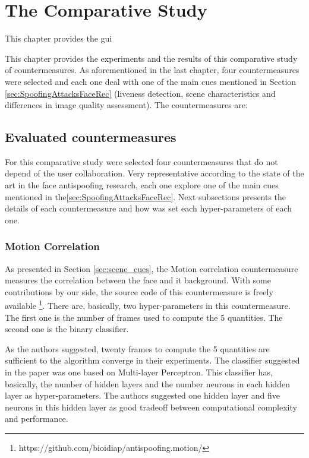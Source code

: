 \chapter{The Comparative Study}
\label{chap:Comparative_Study}

This chapter provides the gui


This chapter provides the experiments and the results of this comparative study of countermeasures. As aforementioned in the last chapter, four countermeasures were selected and each one deal with one of the main cues mentioned in Section \ref{sec:SpoofingAttacksFaceRec} (liveness detection, scene characteristics and differences in image quality assessment). The countermeasures are:



\section{Evaluated countermeasures}
\label{sec:Evaluated_countermeasures}

For this comparative study were selected four countermeasures that do not depend of the user collaboration. Very representative according to the state of the art in the face antispoofing research, each one explore one of the main cues mentioned in the\ref{sec:SpoofingAttacksFaceRec}. Next subsections presents the details of each countermeasure and how was set each hyper-parameters of each one.

\subsection{Motion Correlation}

As presented in Section \ref{sec:scene_cues}, the Motion correlation \cite{AnjosIJCB2011} countermeasure measures the correlation between the face and it background. With some contributions by our side, the source code of this countermeasure is freely available \footnote{https://github.com/bioidiap/antispoofing.motion/}. There are, basically, two hyper-parameters in this countermeasure. The first one is the number of frames used to compute the 5 quantities. The second one is the binary classifier.

As the authors suggested, twenty frames to compute the 5 quantities are sufficient to the algorithm converge in their experiments. The classifier suggested in the paper was one based on Multi-layer Perceptron. This classifier has, basically, the number of hidden layers and the number neurons in each hidden layer as hyper-parameters. The authors suggested one hidden layer and five neurons in this hidden layer as good tradeoff between computational complexity and performance. 

